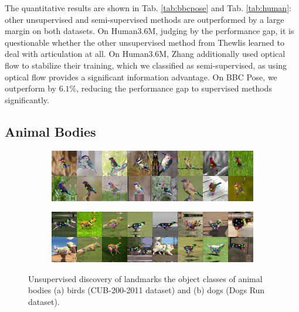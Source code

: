 			The quantitative results are shown in Tab. \ref{tab:bbcpose} and Tab. \ref{tab:human}: other unsupervised and semi-supervised methods are outperformed by a large margin on both datasets.
			On Human3.6M, judging by the performance gap, it is questionable whether the other unsupervised method from Thewlis \etal \cite{thewlis17} learned to deal with articulation at all.
			On Human3.6M, Zhang \etal \cite{zhang18} additionally used optical flow to stabilize their training, which we classified as semi-supervised, as using optical flow provides a significant information advantage.
			On BBC Pose, we outperform \cite{jakab18} by $6.1\%$, reducing the performance gap to supervised methods significantly.





	\subsection{Animal Bodies}\label{sec:kp_animalbodies}
		\begin{figure}[htp]
			\centering
			\begin{subfigure}{1.\textwidth}
			\includegraphics[trim={0cm 0cm 0cm 0cm},clip, width=1.\linewidth]{fig/shape/0birds}\caption{}
			\end{subfigure}
			\begin{subfigure}{1.\textwidth}
			\includegraphics[trim={0cm 0cm 0cm 0cm},clip, width=1.\linewidth]{fig/shape/0dogs}\caption{}
			\end{subfigure}
			\caption{{Unsupervised discovery of landmarks the object classes of animal bodies (a) birds (CUB-200-2011 dataset) and (b) dogs (Dogs Run dataset).}}
			\label{fig:kp_animals}
		\end{figure}


